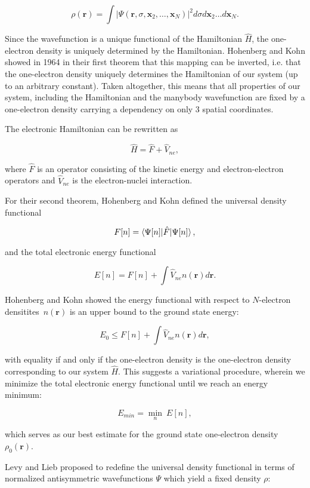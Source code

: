 \begin{equation}
    \rho(\bm{r}) = \int \left| \Psi(\bm{r}, \sigma, \bm{x}_2,\dots,\bm{x}_N)
    \right|^2 d\sigma d\bm{x}_2 \dots d\bm{x}_N .
\end{equation}

Since the wavefunction is a unique functional of the Hamiltonian
$\hat{H}$, the one-electron density is uniquely determined
by the Hamiltonian. Hohenberg and Kohn showed in 1964 in their
first theorem that this mapping
can be inverted, i.e. that the one-electron density uniquely
determines the Hamiltonian of our system (up to an arbitrary constant).
Taken altogether, this means that all properties of our system, including
the Hamiltonian and the manybody wavefunction are fixed
by a one-electron density carrying a dependency on only 3 spatial coordinates.
\par
The electronic Hamiltonian can be rewritten as

$$ \hat{H} = \hat{F} + \hat{V}_{ne} , $$

where $\hat{F}$ is an operator consisting of the kinetic energy
and electron-electron operators and $\hat{V}_{ne}$
is the electron-nuclei interaction.
\par
For their second theorem, Hohenberg and Kohn defined
the universal density functional

$$ F[n] = \braket{\Psi[n] | \hat{F} | \Psi[n]} , $$

and the total electronic energy functional

$$ E[n] = F[n] + \int \hat{V}_{ne} n(\bm{r}) d\bm{r} . $$

Hohenberg and Kohn showed the energy functional
with respect to $N$-electron densitites $n(\bm{r})$
is an upper bound to the ground state energy:

$$ E_0 \leq F[n] + \int \hat{V}_{ne} n(\bm{r}) d\bm{r} , $$

with equality if and only if the one-electron density
is the one-electron density corresponding to our system $\hat{H}$.
This suggests a variational procedure, wherein
we minimize the total electronic energy functional
until we reach an energy minimum:

$$ E_{min} = \underset{n}{\min} \ E[n] , $$

which serves as our best estimate for the ground state
one-electron density $\rho_0(\bm{r})$.
\par
Levy and Lieb proposed to redefine the universal density functional
in terms of normalized antisymmetric wavefunctions $\Psi$
which yield a fixed density $\rho$:

